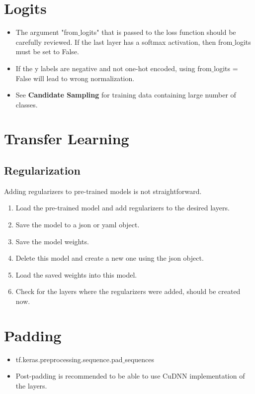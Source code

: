 \documentclass[11pt]{article}
\begin{document}
\begin{multicols*}{2}
\section{Logits}
\begin{itemize}
\item The argument "from$\_$logits" that is passed to the loss function should be carefully reviewed. If the last layer has a softmax activation, then from$\_$logits must be set to False.
\item If the y labels are negative and not one-hot encoded, using from$\_$logits = False will lead to wrong normalization.
\item See \textbf{Candidate Sampling} for training data containing large number of classes.
\end{itemize}


\section{Transfer Learning}

\subsection{Regularization}
Adding regularizers to pre-trained models is not straightforward.
\begin{enumerate}
\item Load the pre-trained model and add regularizers to the desired layers.
\item Save the model to a json or yaml object.
\item Save the model weights.
\item Delete this model and create a new one using the json object.
\item Load the saved weights into this model.
\item Check for the layers where the regularizers were added, should be created now.
\end{enumerate}


\section{Padding}
\begin{itemize}
\item tf.keras.preprocessing.sequence.pad$\_$sequences
\item Post-padding is recommended to be able to use CuDNN implementation of the layers.
\end{itemize}


\end{multicols*}
\end{document}
